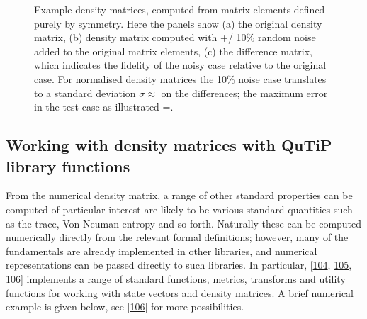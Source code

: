 \documentclass[letterpaper,table,10pt,english]{jupyterBook}
\begin{document}
\begin{figure}[htbp]
\centering
\capstart

\noindent{}
\caption{Example density matrices, computed from matrix elements defined purely by  symmetry. Here the panels show (a) the original density matrix, (b) density matrix computed with +/\sphinxhyphen{} 10\% random noise added to the original matrix elements, (c) the difference matrix, which indicates the fidelity of the noisy case relative to the original case. For normalised density matrices the 10\% noise case translates to a standard deviation \(\sigma\approx\) on the differences; the maximum error in the test case as illustrated =.}\label{\detokenize{part1/theory_density_matrices_190723:fig-denmatd2hcompexample}}\end{figure}


\subsection{Working with density matrices with QuTiP library functions}
\label{\detokenize{part1/theory_density_matrices_190723:working-with-density-matrices-with-qutip-library-functions}}\label{\detokenize{part1/theory_density_matrices_190723:sect-theory-denmat-qutip}}
\sphinxAtStartPar
From the numerical density matrix, a range of other standard properties can be computed \sphinxhyphen{} of particular interest are likely to be various standard quantities such as the trace, Von Neuman entropy and so forth. Naturally these can be computed numerically directly from the relevant formal definitions; however, many of the fundamentals are already implemented in other libraries, and numerical representations can be passed directly to such libraries. In particular,  {[}\hyperlink{cite.backmatter/bibliography:id706}{104}, \hyperlink{cite.backmatter/bibliography:id707}{105}, \hyperlink{cite.backmatter/bibliography:id833}{106}{]} implements a range of standard functions, metrics, transforms and utility functions for working with state vectors and density matrices. A brief numerical example is given below, see  {[}\hyperlink{cite.backmatter/bibliography:id833}{106}{]} for more possibilities.
\end{document}

